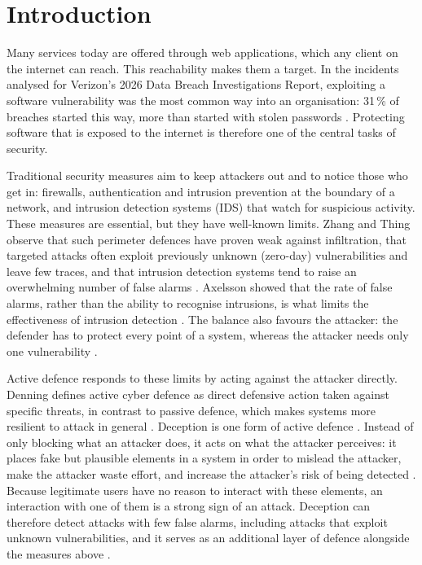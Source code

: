 \documentclass{rptuma}
\begin{document}
\cleardoublepage
{}

\chapter{Introduction}
\label{chap:intro}

Many services today are offered through web applications, which any client on the internet can
reach. This reachability makes them a target. In the incidents analysed for Verizon's 2026 Data
Breach Investigations Report, exploiting a software vulnerability was the most common way into an
organisation: 31\,\% of breaches started this way, more than started with stolen passwords
\cite{verizon2026dbir}. Protecting software that is exposed to the internet is therefore one of the
central tasks of security.

Traditional security measures aim to keep attackers out and to notice those who get in: firewalls,
authentication and intrusion prevention at the boundary of a network, and intrusion detection
systems (IDS) that watch for suspicious activity. These measures are essential, but they have
well-known limits. Zhang and Thing observe that such perimeter defences have proven weak against
infiltration, that targeted attacks often exploit previously unknown (zero-day) vulnerabilities and
leave few traces, and that intrusion detection systems tend to raise an overwhelming number of
false alarms \cite{zhang2021three}. Axelsson showed that the rate of false alarms, rather than the
ability to recognise intrusions, is what limits the effectiveness of intrusion detection
\cite{axelsson2000base}. The balance also favours the attacker: the defender has to protect every
point of a system, whereas the attacker needs only one vulnerability \cite{zhang2021three}.

Active defence responds to these limits by acting against the attacker directly. Denning defines
active cyber defence as direct defensive action taken against specific threats, in contrast to
passive defence, which makes systems more resilient to attack in general
\cite{denning2014framework}. Deception is one form of active defence
\cite{denning2014framework,zhang2021three}. Instead of only blocking what an attacker does, it acts
on what the attacker perceives: it places fake but plausible elements in a system in order to
mislead the attacker, make the attacker waste effort, and increase the attacker's risk of being
detected \cite{zhang2021three}. Because legitimate users have no reason to interact with these
elements, an interaction with one of them is a strong sign of an attack. Deception can therefore
detect attacks with few false alarms, including attacks that exploit unknown vulnerabilities, and
it serves as an additional layer of defence alongside the measures above \cite{zhang2021three}.
\end{document}
